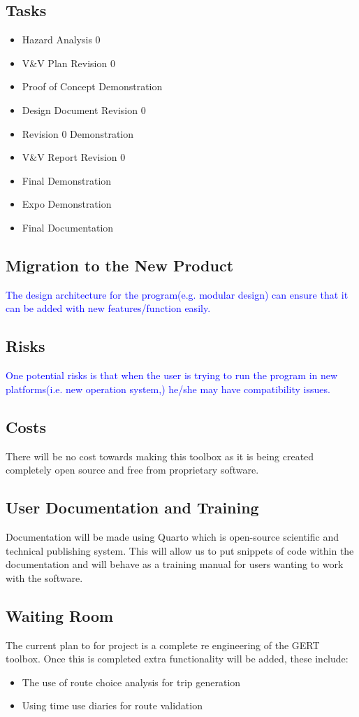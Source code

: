 \documentclass[12pt, titlepage]{article}
\begin{document}
\subsection{Tasks}
\begin{itemize}
    \item Hazard Analysis 0
    \item V&V Plan Revision 0
    \item Proof of Concept Demonstration
    \item Design Document Revision 0
    \item Revision 0 Demonstration
    \item V&V Report Revision 0
    \item Final Demonstration
    \item Expo Demonstration
    \item Final Documentation
\end{itemize}
\subsection{Migration to the New Product}
\textcolor{blue}{The design architecture for the program(e.g. modular design) can ensure that it can be added with new features/function easily.}

\subsection{Risks}
\textcolor{blue}{
One potential risks is that when the user is trying to run the program in new platforms(i.e. new operation system,) he/she
may have compatibility issues.}
\subsection{Costs}
There will be no cost towards making this  toolbox as it is being created completely open source and free from proprietary software.
\subsection{User Documentation and Training}
Documentation will be made using Quarto which is open-source scientific and technical publishing system. This will allow us to put snippets of code within the documentation and will behave as a training manual for users wanting to work with the software. 
\subsection{Waiting Room}
The current plan to for project is a complete re engineering of the GERT toolbox. Once this is completed extra functionality will be added, these include: 
\begin{itemize}
    \item The use of route choice analysis for trip generation 
    \item Using time use diaries for route validation 
\end{itemize}
\end{document}
